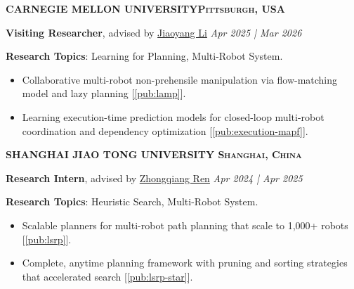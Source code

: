 \documentclass[a4paper,9pt]{extarticle}
\begin{document}
\vspace{-0.02in}
{\textbf{\fontsize{12pt}{4pt}\selectfont C}\textbf{\scshape ARNEGIE MELLON UNIVERSITY\hfill Pittsburgh, USA}}
\par \textbf{Visiting Researcher}, advised by \href{https://jiaoyangli.me/}{Jiaoyang Li} \hfill \textit{Apr 2025 | Mar 2026}
\par \textbf{Research Topics}: Learning for Planning, Multi-Robot System. 
\vspace{-0.05in}
\begin{itemize}
    \item Collaborative multi-robot non-prehensile manipulation via flow-matching model and lazy planning [\ref{pub:lamp}].
    \item Learning execution-time prediction models for closed-loop multi-robot coordination and dependency optimization [\ref{pub:execution-mapf}].
\end{itemize}
\vspace{-0.02in}
{\textbf{\fontsize{12pt}{4pt}\selectfont S}\textbf{\scshape HANGHAI JIAO TONG UNIVERSITY \hfill Shanghai, China}} %
\par \textbf{Research Intern}, advised by \href{https://rap-lab.github.io/team/zren/}{Zhongqiang Ren}  \hfill \textit{Apr 2024 | Apr 2025}
\par \textbf{Research Topics}: Heuristic Search, Multi-Robot System.

\vspace{-0.05in}
\begin{itemize}
    \item Scalable planners for multi-robot path planning that scale to 1,000+ robots [\ref{pub:lsrp}].
    \item Complete, anytime planning framework with pruning and sorting strategies that accelerated search [\ref{pub:lsrp-star}].
\end{itemize}
\end{document}
